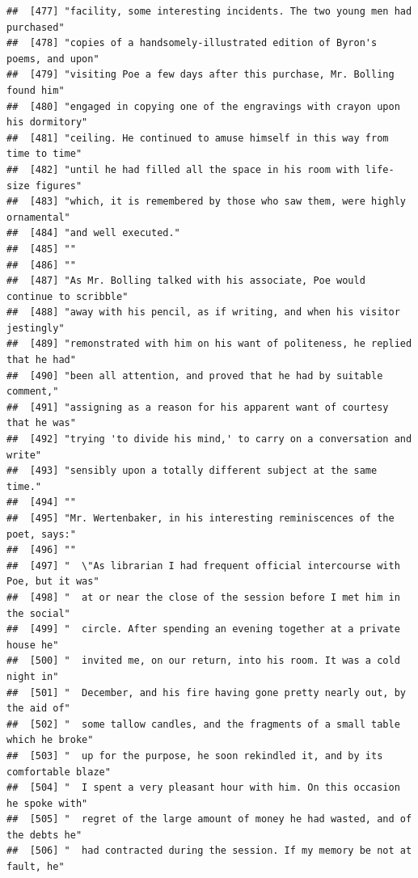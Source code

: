\documentclass{article}\usepackage[]{graphicx}\usepackage[]{color}
\makeatletter
\newenvironment{kframe}{%
 \def\at@end@of@kframe{}%
 \ifinner\ifhmode%
  \def\at@end@of@kframe{\end{minipage}}%
  \begin{minipage}{\columnwidth}%
 \fi\fi%
 \def\FrameCommand##1{\hskip\@totalleftmargin \hskip-\fboxsep
 \colorbox{shadecolor}{##1}\hskip-\fboxsep
     \hskip-\linewidth \hskip-\@totalleftmargin \hskip\columnwidth}%
 \MakeFramed {\advance\hsize-\width
   \@totalleftmargin\z@ \linewidth\hsize
   \@setminipage}}%
 {\par\unskip\endMakeFramed%
 \at@end@of@kframe}
\newenvironment{knitrout}{}{} %
\makeatother
\begin{document}
\begin{knitrout}
\begin{kframe}
\begin{verbatim}
##  [477] "facility, some interesting incidents. The two young men had purchased"       
##  [478] "copies of a handsomely-illustrated edition of Byron's poems, and upon"       
##  [479] "visiting Poe a few days after this purchase, Mr. Bolling found him"          
##  [480] "engaged in copying one of the engravings with crayon upon his dormitory"     
##  [481] "ceiling. He continued to amuse himself in this way from time to time"        
##  [482] "until he had filled all the space in his room with life-size figures"        
##  [483] "which, it is remembered by those who saw them, were highly ornamental"       
##  [484] "and well executed."                                                          
##  [485] ""                                                                            
##  [486] ""                                                                            
##  [487] "As Mr. Bolling talked with his associate, Poe would continue to scribble"    
##  [488] "away with his pencil, as if writing, and when his visitor jestingly"         
##  [489] "remonstrated with him on his want of politeness, he replied that he had"     
##  [490] "been all attention, and proved that he had by suitable comment,"             
##  [491] "assigning as a reason for his apparent want of courtesy that he was"         
##  [492] "trying 'to divide his mind,' to carry on a conversation and write"           
##  [493] "sensibly upon a totally different subject at the same time."                 
##  [494] ""                                                                            
##  [495] "Mr. Wertenbaker, in his interesting reminiscences of the poet, says:"        
##  [496] ""                                                                            
##  [497] "  \"As librarian I had frequent official intercourse with Poe, but it was"   
##  [498] "  at or near the close of the session before I met him in the social"        
##  [499] "  circle. After spending an evening together at a private house he"          
##  [500] "  invited me, on our return, into his room. It was a cold night in"          
##  [501] "  December, and his fire having gone pretty nearly out, by the aid of"       
##  [502] "  some tallow candles, and the fragments of a small table which he broke"    
##  [503] "  up for the purpose, he soon rekindled it, and by its comfortable blaze"    
##  [504] "  I spent a very pleasant hour with him. On this occasion he spoke with"     
##  [505] "  regret of the large amount of money he had wasted, and of the debts he"    
##  [506] "  had contracted during the session. If my memory be not at fault, he"       

\end{verbatim}
\end{kframe}
\end{knitrout}
\end{document}
